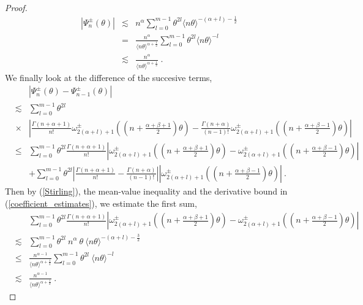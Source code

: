 \documentclass[12pt]{amsart}
\theoremstyle{definition}
\numberwithin{equation}{section}
\begin{document}
\begin{proof}
\begin{eqnarray*}
\left|\Psi^\pm_n(\theta)\right| &\lesssim & n^\alpha \sum_{l=0}^{m-1} \theta^{2l} \langle n\theta\rangle^{-(\alpha +l)-\frac{1}{2}} \\
&=& \frac{n^\alpha}{\langle n\theta\rangle^{\alpha + \frac{1}{2}}} \sum_{l=0}^{m-1} \theta^{2l} \langle n\theta\rangle^{-l} \\
&\lesssim & \frac{n^\alpha}{\langle n\theta\rangle^{\alpha + \frac{1}{2}}}\:.
\end{eqnarray*}
We finally look at the difference of the succesive terms,
\begin{eqnarray*}
&&|\Psi^\pm_n(\theta) -\Psi^\pm_{n-1}(\theta)| \\
&\lesssim& \sum_{l=0}^{m-1} \theta^{2l}\\
&\times&\left|\frac{\Gamma(n+\alpha+1)}{n!}\omega^\pm_{2(\alpha + l)+1}\left(\left(n+\frac{\alpha + \beta +1}{2}\right)\theta\right)-\frac{\Gamma(n+\alpha)}{(n-1)!}\omega^\pm_{2(\alpha + l)+1}\left(\left(n+\frac{\alpha + \beta -1}{2}\right)\theta\right)\right| \\
&\le & \sum_{l=0}^{m-1} \theta^{2l} \frac{\Gamma(n+\alpha+1)}{n!} \left|\omega^\pm_{2(\alpha + l)+1}\left(\left(n+\frac{\alpha + \beta +1}{2}\right)\theta\right)- \omega^\pm_{2(\alpha + l)+1}\left(\left(n+\frac{\alpha + \beta -1}{2}\right)\theta\right)\right| \\&&+ \sum_{l=0}^{m-1} \theta^{2l}\left|\frac{\Gamma(n+\alpha+1)}{n!}-\frac{\Gamma(n+\alpha)}{(n-1)!}\right|\left|\omega^\pm_{2(\alpha + l)+1}\left(\left(n+\frac{\alpha + \beta -1}{2}\right)\theta\right)\right|\:.
\end{eqnarray*}
Then by (\ref{Stirling}), the mean-value inequality and the derivative bound in (\ref{coefficient_estimates}), we estimate the first sum,
\begin{eqnarray*}
&&\sum_{l=0}^{m-1} \theta^{2l} \frac{\Gamma(n+\alpha+1)}{n!} \left|\omega^\pm_{2(\alpha + l)+1}\left(\left(n+\frac{\alpha + \beta +1}{2}\right)\theta\right)- \omega^\pm_{2(\alpha + l)+1}\left(\left(n+\frac{\alpha + \beta -1}{2}\right)\theta\right)\right| \\
&\lesssim & \sum_{l=0}^{m-1} \theta^{2l}\: n^\alpha\: \theta\: \langle n\theta \rangle^{-(\alpha +l)-\frac{3}{2}}\\
&\le & \frac{n^{\alpha -1}}{\langle n\theta\rangle^{\alpha + \frac{1}{2}}} \sum_{l=0}^{m-1} \theta^{2l} \: \langle n\theta\rangle^{-l} \\
& \lesssim & \frac{n^{\alpha -1}}{\langle n\theta\rangle^{\alpha + \frac{1}{2}}}\:. 
\end{eqnarray*}

\end{proof}
\end{document}
